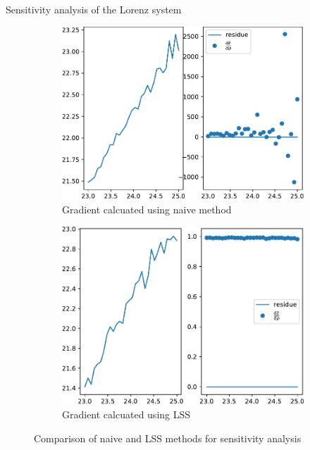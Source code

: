 \documentclass{beamer}
\begin{document}
\begin{frame}{Sensitivity analysis of the Lorenz system}
	\begin{figure}[ht]
			\centering
			\begin{subfigure}{0.5\linewidth} %
				\centering
				\includegraphics[width=\linewidth]{fig/Lorenz1.pdf}
				\caption{Gradient calcuated using naive method}
			  \end{subfigure}%
			  \begin{subfigure}{0.5\linewidth} %
				\centering
				\includegraphics[width=\linewidth]{fig/Lorenz2.pdf}
				\caption{Gradient calcuated using LSS}
			  \end{subfigure}
			  \caption{Comparison of naive and LSS methods for sensitivity analysis}
	\end{figure}
\end{frame}
\end{document}
